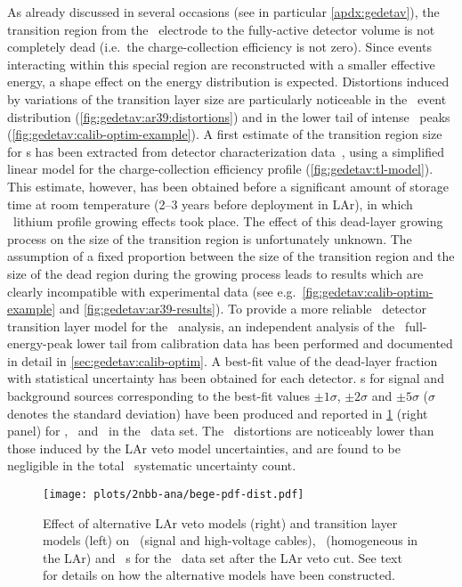\begin{description}[wide]
  \item[Transition layer model] As already discussed in several occasions (see in
    particular \cref{apdx:gedetav}), the transition region from the \nplus\ electrode to
    the fully-active detector volume is not completely dead (i.e.~the charge-collection
    efficiency is not zero). Since events interacting within this special region are
    reconstructed with a smaller effective energy, a shape effect on the energy
    distribution is expected. Distortions induced by variations of the transition layer
    size are particularly noticeable in the \Arl\ event distribution
    (\cref{fig:gedetav:ar39:distortions}) and in the lower tail of intense \g\ peaks
    (\cref{fig:gedetav:calib-optim-example}). A first estimate of the transition region
    size for \bege{}s has been extracted from detector characterization
    data~\cite{Lehnert2016}, using a simplified linear model for the charge-collection
    efficiency profile (\cref{fig:gedetav:tl-model}). This estimate, however, has been
    obtained before a significant amount of storage time at room temperature (2--3 years
    before deployment in LAr), in which \nplus\ lithium profile growing effects took
    place. The effect of this dead-layer growing process on the size of the transition
    region is unfortunately unknown. The assumption of a fixed proportion between the size
    of the transition region and the size of the dead region during the growing process
    leads to results which are clearly incompatible with experimental data (see
    e.g.~\cref{fig:gedetav:calib-optim-example} and \cref{fig:gedetav:ar39-results}).
    \newpar
    To provide a more reliable \bege\ detector transition layer model for the \nnbb\
    analysis, an independent analysis of the \Th\ full-energy-peak lower tail from
    calibration data has been performed and documented in detail in
    \cref{sec:gedetav:calib-optim}. A best-fit value of the dead-layer fraction with
    statistical uncertainty has been obtained for each detector. \pdf{}s for signal and
    background sources corresponding to the best-fit values $\pm1\sigma$, $\pm2\sigma$ and
    $\pm5\sigma$ ($\sigma$ denotes the standard deviation) have been produced and
    reported in \cref{fig:2nbb-ana:pdf-dist} (right panel) for \kvn, \kvz\ and \nnbb\ in
    the \enrBEGeII\ data set. The \pdf\ distortions are noticeably lower than those induced
    by the LAr veto model uncertainties, and are found to be negligible in the total
    \thalftwo\ systematic uncertainty count.

    \begin{figure}
      \centering
      \texttt{[image: plots/2nbb-ana/bege-pdf-dist.pdf]}
      \caption{%
        Effect of alternative LAr veto models (right) and transition layer models (left) on
        \kvn\ (signal and high-voltage cables), \kvz\ (homogeneous in the LAr) and \nnbb\
        \pdf{}s for the \enrBEGeII\ data set after the LAr veto cut. See text for details on how
        the alternative models have been constructed.
      }\label{fig:2nbb-ana:pdf-dist}
    \end{figure}


\end{description}
